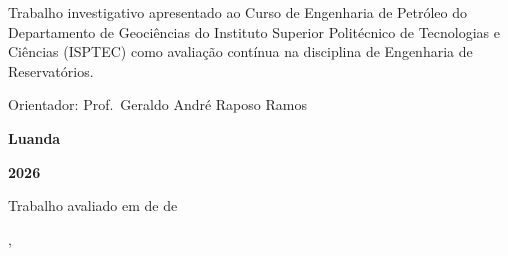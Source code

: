 \documentclass[12pt,a4paper,oneside,brazilian,sumario=tradicional]{abntex2}
\begin{document}
\hspace*{3.5cm}\begin{minipage}[t]{9.5cm}
Trabalho investigativo apresentado ao Curso de Engenharia de Petróleo do Departamento de Geociências do Instituto Superior Politécnico de Tecnologias e Ciências (ISPTEC) como avaliação contínua na disciplina de Engenharia de Reservatórios.

\vspace*{1.0cm}

\noindent Orientador: Prof.\ Geraldo André Raposo Ramos
\end{minipage}

\vspace*{2.0cm}

\begin{center}
  {\large\bfseries Luanda}
  
  {\large\bfseries 2026}
\end{center}

\clearpage

\begin{folhadeaprovacao}
  \thispagestyle{empty}
  \begin{center}
    {\large\bfseries\MakeUppercase{\imprimirautor}}
    \vspace*{1cm}
    \begin{center}
      \bfseries\large\MakeUppercase{\imprimirtitulo}
    \end{center}
    \vspace*{1cm}
    \hspace{.38\textwidth}
    \begin{minipage}{.56\textwidth}
      \imprimirpreambulo
    \end{minipage}
    \vspace*{1cm}
  \end{center}

  Trabalho avaliado em \underline{\hspace{2.0cm}} de \underline{\hspace{3.5cm}} de \underline{\hspace{1.2cm}}

  \vspace{1.5cm}

  \begin{center}
    \imprimirlocal, \imprimirdata
  \end{center}
\end{folhadeaprovacao}
\end{document}
